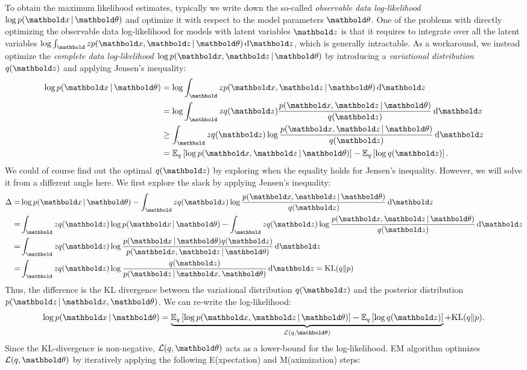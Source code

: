 To obtain the maximum likelihood estimates, typically we write down the so-called \textit{observable data log-likelihood} $\log p(\mbx \g \mb\theta)$ and optimize it with respect to the model parameters $\mb\theta$. One of the problems with directly optimizing the observable data log-likelihood for models with latent variables $\mbz$ is that it requires to integrate over all the latent variables $\log \int_\mbz p(\mbx, \mbz \g \mb\theta) \dif\mbz$, which is generally intractable. As a workaround, we instead optimize the \textit{complete data log-likelihood} $\log p(\mbx, \mbz \g \mb \theta)$ by introducing a \textit{variational distribution} $q(\mbz)$ and applying Jensen's inequality:
\begin{equation}
\begin{split}
\log p(\mbx \g \mb\theta) &= \log\int_\mbz p(\mbx, \mbz \g \mb\theta) \dif{\mbz}\\
&= \log\int_\mbz q(\mbz) \frac{p(\mbx, \mbz \g \mb\theta)}{q(\mbz)} \dif{\mbz}\\
&\geq \int_\mbz q(\mbz) \log\frac{p(\mbx, \mbz \g \mb\theta)}{q(\mbz)} \dif\mbz\\
&= \EE{q}{\log p(\mbx, \mbz \g \mb\theta)} - \EE{q}{\log q(\mbz)}.
\end{split}
\label{chpt:background:eq:em}
\end{equation}
We could of course find out the optimal $q(\mbz)$ by exploring when the equality holds for Jensen's inequality. However, we will solve it from a different angle here. We first explore the slack by applying Jensen's inequality:
\begin{equation}
\begin{split}
\Delta =& \log p(\mbx \g \mb\theta) - \int_\mbz q(\mbz) \log\frac{p(\mbx, \mbz \g \mb\theta)}{q(\mbz)} \dif\mbz \\
=& \int_\mbz q(\mbz)\log p(\mbx \g \mb\theta) - \int_\mbz q(\mbz) \log\frac{p(\mbx, \mbz \g \mb\theta)}{q(\mbz)} \dif\mbz\\
=& \int_\mbz q(\mbz) \log\frac{p(\mbx \g \mb\theta) q(\mbz)} {p(\mbx, \mbz \g \mb\theta)}\dif\mbz\\
=& \int_\mbz q(\mbz) \log\frac{ q(\mbz)} {p(\mbz \g \mbx, \mb\theta)}\dif\mbz = \textrm{KL}(q\|p)
\end{split}
\label{chpt:background:eq:em_kl}
\end{equation}
Thus, the difference is the \gls{KL} divergence between the variational distribution $q(\mbz)$ and the posterior distribution $p(\mbz \g \mbx, \mb\theta)$. We can re-write the log-likelihood:
\[
\log p(\mbx \g \mb\theta) = \underbrace{\EE{q}{\log p(\mbx, \mbz \g \mb\theta)} - \EE{q}{\log q(\mbz)}}_{\cL(q, \mb\theta)} + \textrm{KL}(q\|p).
\]
Since the \gls{KL}-divergence is non-negative, $\cL(q, \mb\theta)$ acts as a lower-bound for the log-likelihood. \gls{EM} algorithm optimizes $\cL(q, \mb\theta)$ by iteratively applying the following E(xpectation) and M(aximization) steps:

